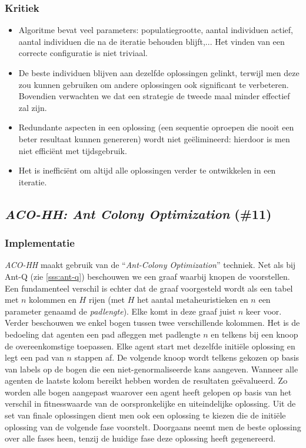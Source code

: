 \subsubsection{Kritiek}
\begin{itemize}
 \item Algoritme bevat veel parameters: populatiegrootte, aantal individuen actief, aantal individuen die na de iteratie behouden blijft,... Het vinden van een correcte configuratie is niet triviaal.
 \item De beste individuen blijven aan dezelfde oplossingen gelinkt, terwijl men deze zou kunnen gebruiken om andere oplossingen ook significant te verbeteren. Bovendien verwachten we dat een strategie de tweede maal minder effectief zal zijn.
 \item Redundante aspecten in een oplossing (een sequentie oproepen die nooit een beter resultaat kunnen genereren) wordt niet ge\"elimineerd: hierdoor is men niet effici\"ent met tijdsgebruik.
 \item Het is ineffici\"ent om altijd alle oplossingen verder te ontwikkelen in een iteratie.
\end{itemize}
\subsection{\emph{ACO-HH: Ant Colony Optimization} (\#11)}
\label{sss:aco-hh}
\subsubsection{Implementatie}
\emph{ACO-HH}\cite{chesc-aco-hh} maakt gebruik van de ``\emph{Ant-Colony Optimization}''\cite{hom/aco} techniek. Net als bij Ant-Q (zie \ref{sss:ant-q}) beschouwen we een graaf waarbij knopen de \abllhn{} voorstellen. Een fundamenteel verschil is echter dat de graaf voorgesteld wordt als een tabel met $n$ kolommen en $H$ rijen (met $H$ het aantal metaheuristieken en $n$ een parameter genaamd de \emph{padlengte}). Elke \abllh{} komt in deze graaf juist $n$ keer voor. Verder beschouwen we enkel bogen tussen twee verschillende kolommen. Het is de bedoeling dat agenten een pad afleggen met padlengte $n$ en telkens bij een knoop de overeenkomstige \abllh{} toepassen. Elke agent start met dezelfde initi\"ele oplossing en legt een pad van $n$ stappen af. De volgende knoop wordt telkens gekozen op basis van labels op de bogen die een niet-genormaliseerde kans aangeven. Wanneer alle agenten de laatste kolom bereikt hebben worden de resultaten ge\"evalueerd. Zo worden alle bogen aangepast waarover een agent heeft gelopen op basis van het verschil in fitnesswaarde van de oorspronkelijke en uiteindelijke oplossing. Uit de set van finale oplossingen dient men ook een oplossing te kiezen die de initi\"ele oplossing van de volgende fase voorstelt. Doorgaans neemt men de beste oplossing over alle fases heen, tenzij de huidige fase deze oplossing heeft gegenereerd.
